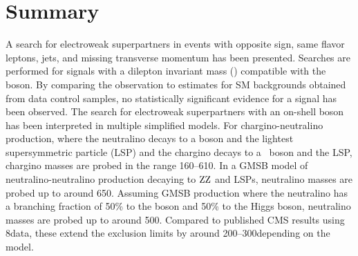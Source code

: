 \section{Summary}
\noindent
\justify
A search for electroweak superpartners in events with opposite sign, same flavor leptons, jets, and missing transverse momentum has been presented. 
Searches are performed for signals with a dilepton invariant mass (\mll) compatible with the \PZ boson.
By comparing the observation to estimates for SM backgrounds obtained from data control samples, no statistically significant evidence for a signal has been observed.
\newpara
\noindent\justify
The search for electroweak superpartners with an on-shell \PZ boson has been interpreted in multiple simplified models.
For chargino-neutralino production, where the neutralino decays to a \PZ boson and the lightest supersymmetric particle (LSP) and the chargino decays to a \PW\ boson and the LSP, chargino masses are probed in the range 160--610\GeV.
In a GMSB model of neutralino-neutralino production decaying to $\mathrm{Z}\mathrm{Z}$ and LSPs, neutralino masses are probed up to around 650\GeV.
Assuming GMSB production where the neutralino has a branching fraction of 50\% to the \PZ boson and 50\% to the Higgs boson, neutralino masses are probed up to around 500\GeV.
Compared to published CMS results using 8\TeV data, these extend the exclusion limits by around 200--300\GeV depending on the model.
